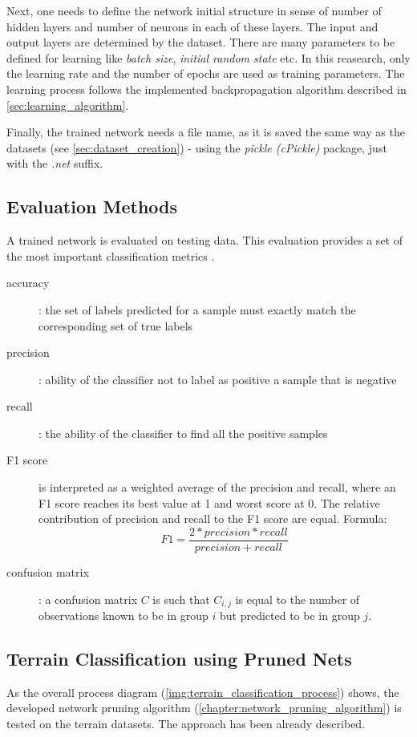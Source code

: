 Next, one needs to define the network initial structure in sense of number of hidden layers and number of neurons in each of these layers. The input and output layers are determined by the dataset. There are many parameters to be defined for learning like \textit{batch size}, \textit{initial random state} etc. In this reasearch, only the learning rate and the number of epochs are used as training parameters. The learning process follows the implemented backpropagation algorithm described in \cref{sec:learning_algorithm}.

Finally, the trained network needs a file name, as it is saved the same way as the datasets (see \cref{sec:dataset_creation}) - using the \textit{pickle (cPickle)} package, just with the \textit{.net} suffix.

\subsection{Evaluation Methods} \label{ssec:evaluation_methods}
A trained network is evaluated on testing data. This evaluation provides a set of the most important classification metrics \citep{article:scikit-learn}.

\begin{description}
\item[accuracy] : the set of labels predicted for a sample must exactly match the corresponding set of true labels
\item[precision] : ability of the classifier not to label as positive a sample that is negative
\item[recall] : the ability of the classifier to find all the positive samples
\item[F1 score] is interpreted as a weighted average of the precision and recall, where an F1 score reaches its best value at 1 and worst score at 0. The relative contribution of precision and recall to the F1 score are equal. Formula:
\begin{equation}
F1 = \frac{2 * precision * recall}{precision + recall}
\end{equation}
\item[confusion matrix] : a confusion matrix $ C $ is such that $ C_{i, j} $ is equal to the number of observations known to be in group $ i $ but predicted to be in group $ j $.
\end{description}

\subsection{Terrain Classification using Pruned Nets} \label{ssec:pruned_net_on_terrains}
As the overall process diagram (\cref{img:terrain_classification_process}) shows, the developed network pruning algorithm (\cref{chapter:network_pruning_algorithm}) is tested on the terrain datasets. The approach has been already described. 

